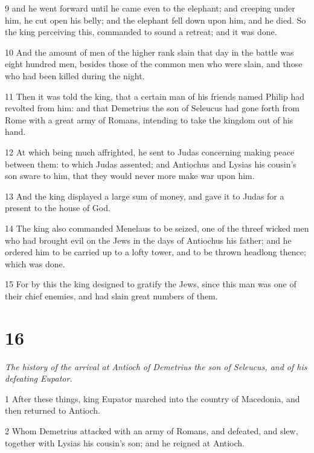 \par 9 and he went forward until he came even to the elephant; and creeping under him, he cut open his belly; and the elephant fell down upon him, and he died. So the king perceiving this, commanded to sound a retreat; and it was done. 

\par 10 And the amount of men of the higher rank slain that day in the battle was eight hundred men, besides those of the common men who were slain, and those who had been killed during the night.

\par 11 Then it was told the king, that a certain man of his friends named Philip had revolted from him: and that Demetrius the son of Seleucus had gone forth from Rome with a great army of Romans, intending to take the kingdom out of his hand. 

\par 12 At which being much affrighted, he sent to Judas concerning making peace between them: to which Judas assented; and Antiochus and Lysias his cousin’s son sware to him, that they would never more make war upon him. 

\par 13 And the king displayed a large sum of money, and gave it to Judas for a present to the house of God. 

\par 14 The king also commanded Menelaus to be seized, one of the threef wicked men who had brought evil on the Jews in the days of Antiochus his father; and he ordered him to be carried up to a lofty tower, and to be thrown headlong thence; which was done. 

\par 15 For by this the king designed to gratify the Jews, since this man was one of their chief enemies, and had slain great numbers of them. 

\chapter{16}

\par \textit{The history of the arrival at Antioch of Demetrius the son of Seleucus, and of his defeating Eupator.}

\par 1 After these things, king Eupator marched into the country of Macedonia, and then returned to Antioch. 

\par 2 Whom Demetrius attacked with an army of Romans, and defeated, and slew, together with Lysias his cousin’s son; and he reigned at Antioch. 


